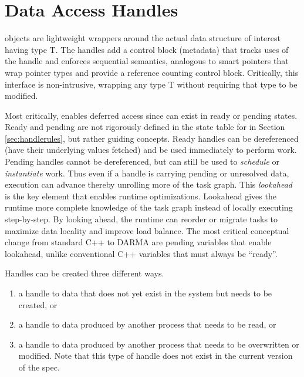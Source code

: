 

\section{Data Access Handles}
\label{sec:handles}
 objects are lightweight wrappers around the actual data structure of interest having type T. 
The handles add a control block (metadata) that tracks uses of the handle and enforces
\gls{sequential semantics}, analogous to smart pointers that wrap pointer types and provide a reference counting control block.
Critically, this interface is non-intrusive, wrapping any type T without requiring that type to be modified.

Most critically, \ahandle enables deferred access since \ahandle can exist in ready or pending states. 
Ready and pending are not rigorously defined in the state table for \ahandle in Section \ref{sec:handlerules},
but rather guiding concepts.
Ready handles can be dereferenced (have their underlying values \gls{fetch}ed) and be used immediately to perform work.
Pending handles cannot be dereferenced, but can still be used to \emph{schedule} or \emph{instantiate} work.
Thus even if a handle is carrying pending or unresolved data, execution can advance thereby unrolling more of the task graph.
This \emph{lookahead} is the key element that enables runtime optimizations.
Lookahead gives the runtime more complete knowledge of the task graph instead of locally executing step-by-step.
By looking ahead, the runtime can reorder or migrate tasks to maximize data locality and improve load balance.
The most critical conceptual change from standard C++ to DARMA are pending variables that enable lookahead, unlike conventional C++ variables that must always be ``ready''.

Handles can be created three different ways.
\begin{enumerate}
\item a handle to data that does not yet exist in the system
but needs to be created, or
\item a handle to data produced by another process that needs to
be read, or 
\item a handle to data produced by another process that needs to be overwritten or modified. 
Note that this type of handle does not exist in the current version of the spec.
\end{enumerate}

